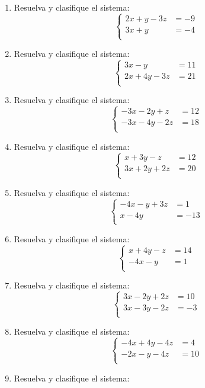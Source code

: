 \documentclass[11pt]{article}
\begin{document}
\begin{enumerate}
\item Resuelva y clasifique el sistema:
\[
\left\{\begin{aligned}
2x+y-3z&=-9\\
3x+y&=-4\\
\end{aligned}\right.
\]
\item Resuelva y clasifique el sistema:
\[
\left\{\begin{aligned}
3x-y&=11\\
2x+4y-3z&=21\\
\end{aligned}\right.
\]
\item Resuelva y clasifique el sistema:
\[
\left\{\begin{aligned}
-3x-2y+z&=12\\
-3x-4y-2z&=18\\
\end{aligned}\right.
\]
\item Resuelva y clasifique el sistema:
\[
\left\{\begin{aligned}
x+3y-z&=12\\
3x+2y+2z&=20\\
\end{aligned}\right.
\]
\item Resuelva y clasifique el sistema:
\[
\left\{\begin{aligned}
-4x-y+3z&=1\\
x-4y&=-13\\
\end{aligned}\right.
\]
\item Resuelva y clasifique el sistema:
\[
\left\{\begin{aligned}
x+4y-z&=14\\
-4x-y&=1\\
\end{aligned}\right.
\]
\item Resuelva y clasifique el sistema:
\[
\left\{\begin{aligned}
3x-2y+2z&=10\\
3x-3y-2z&=-3\\
\end{aligned}\right.
\]
\item Resuelva y clasifique el sistema:
\[
\left\{\begin{aligned}
-4x+4y-4z&=4\\
-2x-y-4z&=10\\
\end{aligned}\right.
\]
\item Resuelva y clasifique el sistema:

\end{enumerate}
\end{document}
